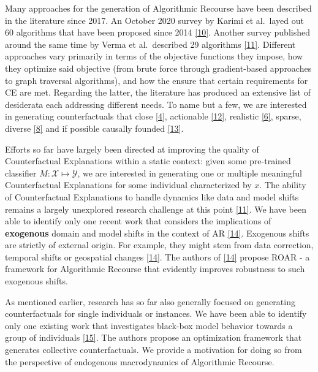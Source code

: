 \documentclass[conference,final,]{IEEEtran}
\theoremstyle{definition}
\theoremstyle{definition}
\theoremstyle{definition}
\theoremstyle{definition}
\theoremstyle{remark}
\begin{document}
Many approaches for the generation of Algorithmic Recourse have been described in the literature since 2017. An October 2020 survey by Karimi et al.~layed out 60 algorithms that have been proposed since 2014 \protect\hyperlink{ref-karimi2020survey}{{[}10{]}}. Another survey published around the same time by Verma et al.~described 29 algorithms \protect\hyperlink{ref-verma2020counterfactual}{{[}11{]}}. Different approaches vary primarily in terms of the objective functions they impose, how they optimize said objective (from brute force through gradient-based approaches to graph traversal algorithms), and how the ensure that certain requirements for CE are met. Regarding the latter, the literature has produced an extensive list of desiderata each addressing different needs. To name but a few, we are interested in generating counterfactuals that close \protect\hyperlink{ref-wachter2017counterfactual}{{[}4{]}}, actionable \protect\hyperlink{ref-ustun2019actionable}{{[}12{]}}, realistic \protect\hyperlink{ref-schut2021generating}{{[}6{]}}, sparse, diverse \protect\hyperlink{ref-mothilal2020explaining}{{[}8{]}} and if possible causally founded \protect\hyperlink{ref-karimi2021algorithmic}{{[}13{]}}.

Efforts so far have largely been directed at improving the quality of Counterfactual Explanations within a static context: given some pre-trained classifier \(M: \mathcal{X} \mapsto \mathcal{Y}\), we are interested in generating one or multiple meaningful Counterfactual Explanations for some individual characterized by \(x\). The ability of Counterfactual Explanations to handle dynamics like data and model shifts remains a largely unexplored research challenge at this point \protect\hyperlink{ref-verma2020counterfactual}{{[}11{]}}. We have been able to identify only one recent work that considers the implications of \textbf{exogenous} domain and model shifts in the context of AR \protect\hyperlink{ref-upadhyay2021towards}{{[}14{]}}. Exogenous shifts are strictly of external origin. For example, they might stem from data correction, temporal shifts or geospatial changes \protect\hyperlink{ref-upadhyay2021towards}{{[}14{]}}. The authors of \protect\hyperlink{ref-upadhyay2021towards}{{[}14{]}} propose ROAR - a framework for Algorithmic Recourse that evidently improves robustness to such exogenous shifts.

As mentioned earlier, research has so far also generally focused on generating counterfactuals for single individuals or instances. We have been able to identify only one existing work that investigates black-box model behavior towards a group of individuals \protect\hyperlink{ref-carrizosa2021generating}{{[}15{]}}. The authors propose an optimization framework that generates collective counterfactuals. We provide a motivation for doing so from the perspective of endogenous macrodynamics of Algorithmic Recourse.
\end{document}
